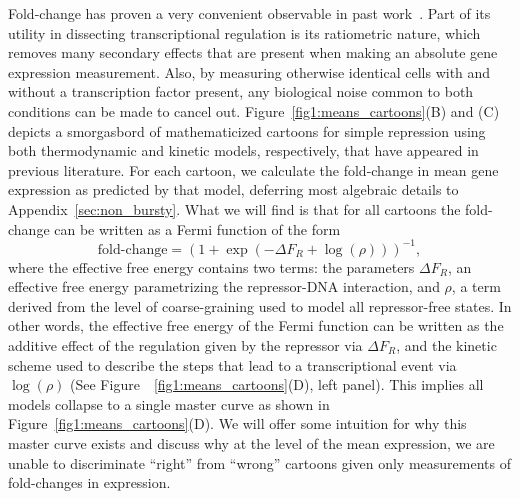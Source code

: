 Fold-change has proven a very convenient observable in past
work~\cite{Garcia2011a, Brewster2014, Razo-Mejia2018, Chure2019}. Part of its
utility in dissecting transcriptional regulation is its ratiometric nature,
which removes many secondary effects that are present when making an absolute
gene expression measurement. Also, by measuring otherwise identical cells with
and without a transcription factor present, any biological noise common to both
conditions can be made to cancel out. Figure~\ref{fig1:means_cartoons}(B) and
(C) depicts a smorgasbord of mathematicized cartoons for simple repression using
both thermodynamic and kinetic models, respectively, that have appeared in
previous literature. For each cartoon, we calculate the fold-change in mean gene
expression as predicted by that model, deferring most algebraic details to
Appendix~\ref{sec:non_bursty}. What we will find is that for all cartoons the
fold-change can be written as a Fermi function of the form
\begin{equation}
 \text{fold-change} = \left( 1 + \exp(-\Delta F_R + \log(\rho))  \right)^{-1},
 \label{eq:deltaFR_eq_noneq_equiv}
\end{equation}
where the effective free energy contains two terms: the parameters $\Delta F_R$,
an effective free energy parametrizing the repressor-DNA interaction, and
$\rho$, a term derived from the level of coarse-graining used to model all
repressor-free states. In other words, the effective free energy of the Fermi
function can be written as the additive effect of the regulation given by the
repressor via $\Delta F_R$, and the kinetic scheme used to describe the steps
that lead to a transcriptional event via $\log(\rho)$ (See
Figure~~\ref{fig1:means_cartoons}(D), left panel). This implies all models
collapse to a single master curve as shown in
Figure~\ref{fig1:means_cartoons}(D). We will offer some intuition for why this
master curve exists and discuss why at the level of the mean expression, we are
unable to discriminate ``right'' from ``wrong'' cartoons given only measurements
of fold-changes in expression.

